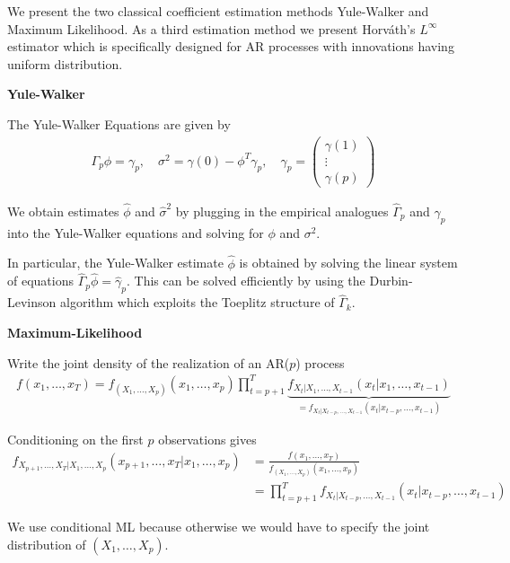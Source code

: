 We present the two classical coefficient estimation methods Yule-Walker and Maximum Likelihood. As a third estimation method we present Horváth's $L^{\infty}$ estimator which is specifically designed for AR processes with innovations having uniform distribution.

\textbf{Yule-Walker}

The Yule-Walker Equations are given by
\begin{align*}
    \Gamma_p\phi=\gamma_p,\quad\sigma^2=\gamma(0)-\phi^{T}\gamma_p,\quad\gamma_p=\begin{pmatrix}
        \gamma(1)\\
        \vdots\\
        \gamma(p)
    \end{pmatrix}
\end{align*}

We obtain estimates $\hat{\phi}$ and $\hat{\sigma}^2$ by plugging in the empirical analogues $\hat{\Gamma}_p$ and $\hat{\gamma}_p$ into the Yule-Walker equations and solving for $\phi$ and $\sigma^2$. 

In particular, the Yule-Walker estimate $\hat{\phi}$ is obtained by solving the linear system of equations $\hat{\Gamma}_p\hat{\phi}=\hat{\gamma}_p$. This can be solved efficiently by using the Durbin-Levinson algorithm which exploits the Toeplitz structure of $\hat{\Gamma}_k$.

\textbf{Maximum-Likelihood}

Write the joint density of the realization of an AR($p$) process
\begin{align*}
    f(x_1,\dots,x_T)=f_{(X_1,\dots,X_p)}(x_1,\dots,x_p)\prod_{t=p+1}^{T}\underbrace{f_{X_t|X_1,\dots,X_{t-1}}(x_t|x_1,\dots,x_{t-1})}_{=f_{X_t|X_{t-p},\dots,X_{t-1}}(x_t|x_{t-p},\dots,x_{t-1})}
\end{align*}

Conditioning on the first $p$ observations gives
\begin{equation}\label{eq:cond_max_likelihood}
    \begin{aligned}
        f_{X_{p+1},\dots,X_T|X_1,\dots,X_p}(x_{p+1},\dots,x_T|x_1,\dots,x_p)&=\frac{f(x_1,\dots,x_T)}{f_{(X_1,\dots,X_p)}(x_1,\dots,x_p)}\\&
        =\prod_{t=p+1}^{T}f_{X_t|X_{t-p},\dots,X_{t-1}}(x_t|x_{t-p},\dots,x_{t-1})
    \end{aligned}
\end{equation}

We use conditional ML because otherwise we would have to specify the joint distribution of $(X_1,\dots,X_p)$.

